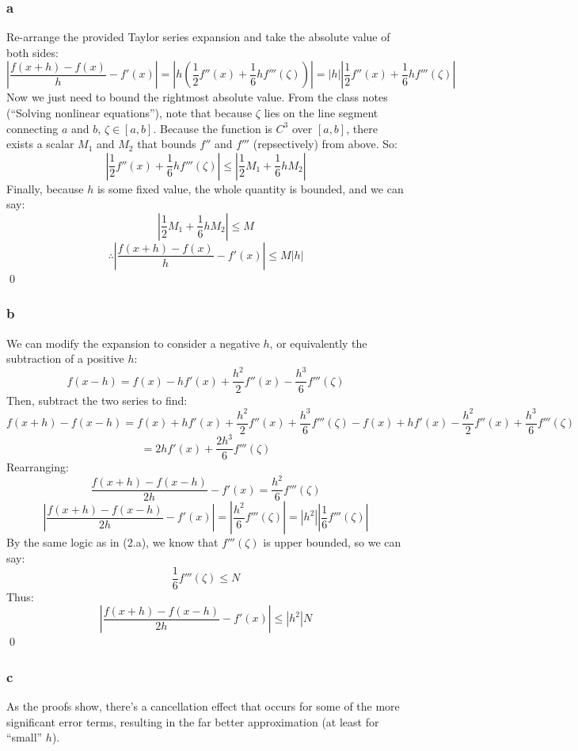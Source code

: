 \documentclass[11pt]{report}
\theoremstyle{definition}
\begin{document}
\subsubsection*{a}
Re-arrange the provided Taylor series expansion and take the absolute value of both sides:
\[
	\left|\frac{f(x+h)-f(x)}{h} - f'(x)\right|
	= \left|h(\frac{1}{2}f''(x)+\frac{1}{6}hf'''(\zeta))\right|
	= \left|h\right|\left|\frac{1}{2}f''(x)+\frac{1}{6}hf'''(\zeta)\right|
\]
Now we just need to bound the rightmost absolute value. From the class notes
(``Solving nonlinear equations''), note that because $\zeta$ lies on the line
segment connecting $a$ and $b$, $\zeta\in[a,b]$. Because the function is $C^3$
over $[a,b]$, there exists a scalar $M_1$ and $M_2$ that bounds $f''$ and $f'''$
(repsectively) from above. So:
\[
	\left|\frac{1}{2}f''(x)+\frac{1}{6}hf'''(\zeta)\right|
	\leq\left|\frac{1}{2}M_1 + \frac{1}{6}hM_2\right|
\]
Finally, because $h$ is some fixed value, the whole quantity is bounded, and we can say:
\[
	\left|\frac{1}{2}M_1 + \frac{1}{6}hM_2\right|
	\leq M
\]
\[
	\therefore
	\left|\frac{f(x+h)-f(x)}{h} - f'(x)\right|
	\leq M|h|
\]
\qed
\subsubsection*{b}
We can modify the expansion to consider a negative $h$, or equivalently the subtraction of
a positive $h$:
\[
	f(x-h) = f(x) - hf'(x) + \frac{h^2}{2}f''(x)-\frac{h^3}{6}f'''(\zeta)
\]
Then, subtract the two series to find:
\[
	f(x+h)-f(x-h)
	= f(x)+hf'(x)+\frac{h^2}{2}f''(x)+\frac{h^3}{6}f'''(\zeta)
	- f(x)+hf'(x)-\frac{h^2}{2}f''(x)+\frac{h^3}{6}f'''(\zeta)
\]
\[
	= 2hf'(x)+\frac{2h^3}{6}f'''(\zeta)
\]
Rearranging:
\[
	\frac{f(x+h)-f(x-h)}{2h} -f'(x)
	= \frac{h^2}{6}f'''(\zeta)
\]
\[
	\left|\frac{f(x+h)-f(x-h)}{2h} -f'(x)\right|
	= \left|\frac{h^2}{6}f'''(\zeta)\right|
	= \left|h^2\right|\left|\frac{1}{6}f'''(\zeta)\right|
\]
By the same logic as in (2.a), we know that $f'''(\zeta)$ is upper bounded, so we can say:
\[\frac{1}{6}f'''(\zeta)\leq N\]
Thus:
\[
	\left|\frac{f(x+h)-f(x-h)}{2h} -f'(x)\right|
	\leq \left|h^2\right|N
\]
\qed

\subsubsection*{c}
As the proofs show, there's a cancellation effect that occurs for some of the more significant
error terms, resulting in the far better approximation (at least for ``small'' $h$).
\end{document}
